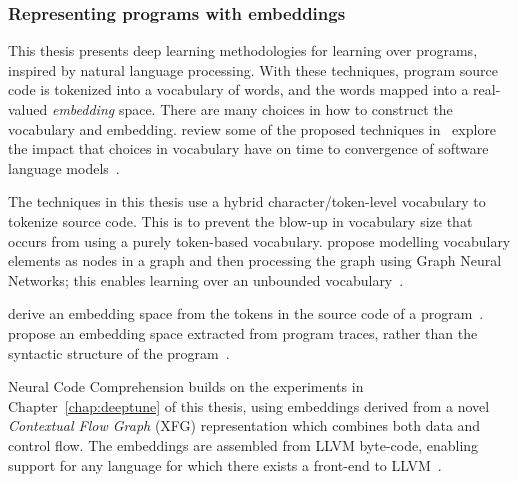 \subsubsection{Representing programs with embeddings}

This thesis presents deep learning methodologies for learning over programs, inspired by natural language processing. With these techniques, program source code is tokenized into a vocabulary of words, and the words mapped into a real-valued \emph{embedding} space.
There are many choices in how to construct the vocabulary and embedding. \citeauthor{Allamanis2017a} review some of the proposed techniques in~\cite{Allamanis2017a}
\citeauthor{Babii} explore the impact that choices in vocabulary have on time to convergence of software language models~\cite{Babii}.

The techniques in this thesis use a hybrid character/token-level vocabulary to tokenize source code. This is to prevent the blow-up in vocabulary size that occurs from using a purely token-based vocabulary. \citeauthor{Cvitkovic2018a} propose modelling vocabulary elements as nodes in a graph and then processing the graph using Graph Neural Networks; this enables learning over an unbounded vocabulary~\cite{Cvitkovic2018a}.

\citeauthor{Mou2016} derive an embedding space from the tokens in the source code of a program~\cite{Mou2016}.
\citeauthor{Wang2017d} propose an embedding space extracted from program traces, rather than the syntactic structure of the program~\cite{Wang2017d}.

Neural Code Comprehension builds on the experiments in Chapter~\ref{chap:deeptune} of this thesis, using embeddings derived from a novel \emph{Contextual Flow Graph} (XFG) representation which combines both data and control flow. The embeddings are assembled from LLVM byte-code, enabling support for any language for which there exists a front-end to LLVM~\cite{Ben-nun2018}.
